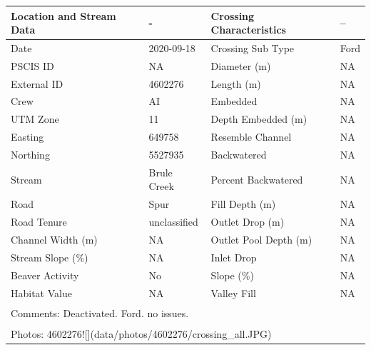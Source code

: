 \documentclass[
]{book}
\begin{document}
\begin{tabular}{l|l|l|l}
\hline
Location and Stream Data & - & Crossing Characteristics & --\\
\hline
Date & 2020-09-18 & Crossing Sub Type & Ford\\
\hline
PSCIS ID & NA & Diameter (m) & NA\\
\hline
External ID & 4602276 & Length (m) & NA\\
\hline
Crew & AI & Embedded & NA\\
\hline
UTM Zone & 11 & Depth Embedded (m) & NA\\
\hline
Easting & 649758 & Resemble Channel & NA\\
\hline
Northing & 5527935 & Backwatered & NA\\
\hline
Stream & Brule Creek & Percent Backwatered & NA\\
\hline
Road & Spur & Fill Depth (m) & NA\\
\hline
Road Tenure & unclassified & Outlet Drop (m) & NA\\
\hline
Channel Width (m) & NA & Outlet Pool Depth (m) & NA\\
\hline
Stream Slope (\%) & NA & Inlet Drop & NA\\
\hline
Beaver Activity & No & Slope (\%) & NA\\
\hline
Habitat Value & NA & Valley Fill & NA\\
\hline
\multicolumn{4}{l}{\textsuperscript{} Comments: Deactivated. Ford. no issues.}\\
\multicolumn{4}{l}{\textsuperscript{} Photos: 4602276![](data/photos/4602276/crossing\_all.JPG)}\\
\end{tabular}
\end{document}
